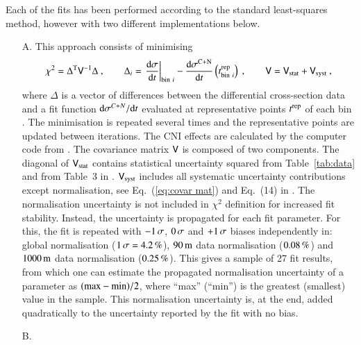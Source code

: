 Each of the fits has been performed according to the standard least-squares method, however with two different implementations below.

\begin{enumerate}

\item[A.] This approach consists of minimising
\begin{equation}
\label{eq:chi sq A}
	\chi^2 = \Delta^{\rm T} \mathsf{V}^{-1} \Delta\ ,\qquad
	\Delta_i = \left.{{\rm d}\sigma\over {\rm d} t}\right|_{{\rm bin}\ i} - {{\rm d}\sigma^{\rm C+N}\over{\rm d} t}\left(t^{\rm rep}_{{\rm bin}\ i}\right)\ ,\qquad
	\mathsf{V} = \mathsf{V}_{\rm stat} + \mathsf{V}_{\rm syst}\ ,
\end{equation}
where $\Delta$ is a vector of differences between the differential cross-section data and a fit function ${\rm d}\sigma^{C+N}/{\rm d} t$ evaluated at representative points $t^{\rm rep}$ of each bin \cite{lafferty94}. The minimisation is repeated several times and the representative points are updated between iterations. The CNI effects are calculated by the computer code from \cite{elegent}. The covariance matrix $\mathsf{V}$ is composed of two components. The diagonal of $\mathsf{V}_{\rm stat}$ contains statistical uncertainty squared from Table~\ref{tab:data} and from Table~3 in \cite{8tev-90m}. $\mathsf{V}_{\rm syst}$ includes all systematic uncertainty contributions except normalisation, see Eq.~(\ref{eq:covar mat}) and Eq.~(14) in \cite{8tev-90m}. The normalisation uncertainty is not included in $\chi^2$ definition for increased fit stability. Instead, the uncertainty is propagated for each fit parameter. For this, the fit is repeated with $-1\,{\rm \sigma}$, $0\,{\rm \sigma}$ and $+1\,{\rm \sigma}$ biases independently in: global normalisation ($1\,{\rm \sigma} = 4.2\,{\rm \%}$), $90\,{\rm m}$ data normalisation ($0.08\,{\rm \%}$) and $1000\,{\rm m}$ data normalisation ($0.25\,{\rm \%}$). This gives a sample of 27 fit results, from which one can estimate the propagated normalisation uncertainty of a parameter as $(\hbox{max} - \hbox{min})/2$, where ``max'' (``min'') is the greatest (smallest) value in the sample. This normalisation uncertainty is, at the end, added quadratically to the uncertainty reported by the fit with no bias.


\item[B.] 

\end{enumerate}


